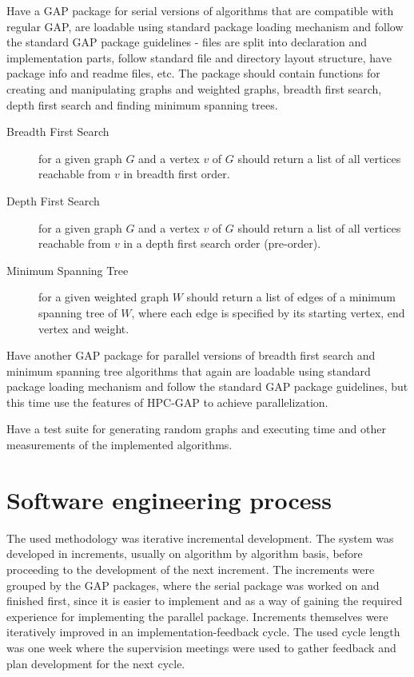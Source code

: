 \documentclass{report}
\theoremstyle{plain}
\theoremstyle{definition}
\theoremstyle{remark}
\begin{document}
Have a GAP package for serial versions of algorithms that are compatible with regular GAP, are loadable using standard package loading mechanism and follow the standard GAP package guidelines - files are split into declaration and implementation parts, follow standard file and directory layout structure, have package info and readme files, etc. The package should contain functions for creating and manipulating graphs and weighted graphs, breadth first search, depth first search and finding minimum spanning trees.
\begin{description}
\item[Breadth First Search] for a given graph $G$ and a vertex $v$ of $G$ should return a list of all vertices reachable from $v$ in breadth first order.
\item[Depth First Search] for a given graph $G$ and a vertex $v$ of $G$ should return a list of all vertices reachable from $v$ in a depth first search order (pre-order).
\item[Minimum Spanning Tree] for a given weighted graph $W$ should return a list of edges of a minimum spanning tree of $W$, where each edge is specified by its starting vertex, end vertex and weight.
\end{description}

Have another GAP package for parallel versions of breadth first search and minimum spanning tree algorithms that again are loadable using standard package loading mechanism and follow the standard GAP package guidelines, but this time use the features of HPC-GAP to achieve parallelization.

Have a test suite for generating random graphs and executing time and other measurements of the implemented algorithms.

\section{Software engineering process}
 
The used methodology was iterative incremental development. The system was developed in increments, usually on algorithm by algorithm basis, before proceeding to the development of the next increment. The increments were grouped by the GAP packages, where the serial package was worked on and finished first, since it is easier to implement and as a way of gaining the required experience for implementing the parallel package. Increments themselves were iteratively improved in an implementation-feedback cycle. The used cycle length was one week where the supervision meetings were used to gather feedback and plan development for the next cycle.
\end{document}

